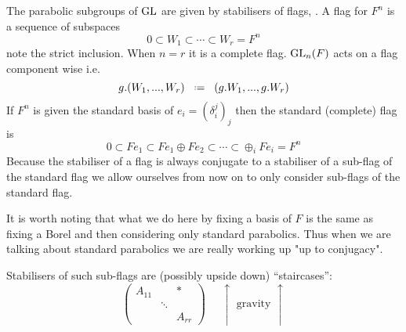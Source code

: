 \begin{example}[\(\GL_n\)]
    The parabolic subgroups of \(\operatorname{GL}\) are given by stabilisers of flags, \cite[Exercise 3.2.16, 6.2.11]{springerLinearAlgebraicGroups1998}\cite{conradStandardParabolicSubgroups}.
    A flag for \(F^n\) is a sequence of subspaces
    \[0\subset W_1 \subset \cdots \subset W_r = F^n\]
    note the strict inclusion. When \(n = r\) it is a complete flag. \(\operatorname{GL}_n(F)\) acts on a flag component wise i.e. 
    \[g.(W_1, ..., W_r) \defeq (g.W_1, ..., g.W_r)\]
    If \(F^n\) is given the standard basis of \(e_i = (\delta_i^j)_j\) then the standard (complete) flag is 
    \[0 \subset Fe_1 \subset Fe_1 \oplus Fe_2 \subset \cdots \subset \oplus_i Fe_i = F^n\]
    Because the stabiliser of a flag is always conjugate to a stabiliser of a sub-flag of the standard flag we allow ourselves from now on to only consider sub-flags of the standard flag. 
    
    \begin{Remark}
        It is worth noting that what we do here by fixing a basis of \(F\) is the same as fixing a Borel and then considering only standard parabolics. Thus when we are talking about standard parabolics we are really working up "up to conjugacy".
    \end{Remark}
    
    Stabilisers of such sub-flags are (possibly upside down) ``staircases'':
    \[\begin{pmatrix}
        A_{11} && \ast\\
         & \ddots & \\
         && A_{rr} 
    \end{pmatrix}   \;\;\;\;\; \uparrow \text{ gravity }\uparrow \]


\end{example}
